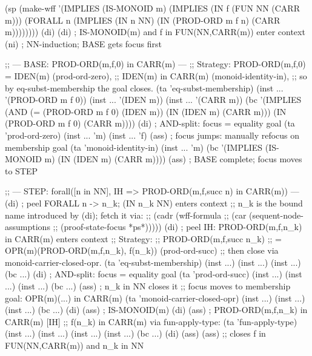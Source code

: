 \begin{VNBcode}
(sp (make-wff '(IMPLIES (IS-MONOID m)
               (IMPLIES (IN f (FUN NN (CARR m)))
                 (FORALL n (IMPLIES (IN n NN)
                   (IN (PROD-ORD m f n) (CARR m))))))))
(di) (di)   ; IS-MONOID(m) and f in FUN(NN,CARR(m)) enter context
(ni)        ; NN-induction; BASE gets focus first

;; --- BASE: PROD-ORD(m,f,0) in CARR(m) ---
;; Strategy: PROD-ORD(m,f,0) = IDEN(m) (prod-ord-zero),
;;           IDEN(m) in CARR(m)            (monoid-identity-in),
;;           so by eq-subst-membership the goal closes.
(ta 'eq-subst-membership)
(inst ... '(PROD-ORD m f 0)) (inst ... '(IDEN m)) (inst ... '(CARR m))
(bc '(IMPLIES (AND (= (PROD-ORD m f 0) (IDEN m)) (IN (IDEN m) (CARR m)))
              (IN (PROD-ORD m f 0) (CARR m))))
(di)    ; AND-split: focus = equality goal
(ta 'prod-ord-zero) (inst ... 'm) (inst ... 'f) (ass)
        ; focus jumps: manually refocus on membership goal
(ta 'monoid-identity-in) (inst ... 'm)
(bc '(IMPLIES (IS-MONOID m) (IN (IDEN m) (CARR m)))) (ass)
        ; BASE complete; focus moves to STEP

;; --- STEP: forall([n in NN], IH => PROD-ORD(m,f,succ n) in CARR(m)) ---
(di)    ; peel FORALL n -> n_k; (IN n_k NN) enters context
;; n_k is the bound name introduced by (di); fetch it via:
;;   (cadr (wff-formula
;;           (car (sequent-node-assumptions
;;                  (proof-state-focus *ps*)))))
(di)    ; peel IH: PROD-ORD(m,f,n_k) in CARR(m) enters context
;; Strategy:
;;   PROD-ORD(m,f,succ n_k)
;;     = OPR(m)(PROD-ORD(m,f,n_k), f(n_k))   (prod-ord-succ)
;;   then close via monoid-carrier-closed-opr.
(ta 'eq-subst-membership) (inst ...) (inst ...) (inst ...)
(bc ...)
(di)    ; AND-split: focus = equality goal
(ta 'prod-ord-succ)
(inst ...) (inst ...) (inst ...)
(bc ...) (ass)   ; n_k in NN closes it
;; focus moves to membership goal: OPR(m)(...) in CARR(m)
(ta 'monoid-carrier-closed-opr)
(inst ...) (inst ...) (inst ...)
(bc ...)
(di) (ass)   ; IS-MONOID(m)
(di) (ass)   ; PROD-ORD(m,f,n_k) in CARR(m) [IH]
;; f(n_k) in CARR(m) via fun-apply-type:
(ta 'fun-apply-type)
(inst ...) (inst ...) (inst ...) (inst ...)
(bc ...) (di) (ass) (ass)
;; closes f in FUN(NN,CARR(m)) and n_k in NN
\end{VNBcode}

